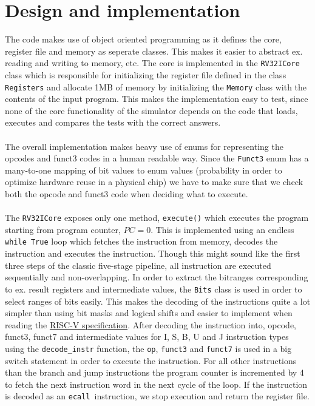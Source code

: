 \documentclass{article}
\begin{document}
\section{Design and implementation}
The code makes use of object oriented programming as it defines the core, register file and memory as seperate classes. This makes it easier to abstract ex. reading and writing to memory, etc. The core is implemented in the \Verb|RV32ICore| class which is responsible for initializing the register file defined in the class \Verb|Registers| and allocate 1MB of memory by initializing the \Verb|Memory| class with the contents of the input program. This makes the implementation easy to test, since none of the core functionality of the simulator depends on the code that loads, executes and compares the tests with the correct answers. \\
\\
The overall implementation makes heavy use of enums for representing the opcodes and funct3 codes in a human readable way. Since the \Verb|Funct3| enum has a many-to-one mapping of bit values to enum values (probability in order to optimize hardware reuse in a physical chip) we have to make sure that we check both the opcode and funct3 code when deciding what to execute. \\
\\
The \Verb|RV32ICore| exposes only one method, \Verb|execute()| which executes the program starting from program counter, $PC = 0$. This is implemented using an endless \Verb|while True| loop which fetches the instruction from memory, decodes the instruction and executes the instruction. Though this might sound like the first three steps of the classic five-stage pipeline, all instruction are executed sequentially and non-overlapping. In order to extract the bitranges corresponding to ex. result registers and intermediate values, the \Verb|Bits| class is used in order to select ranges of bits easily. This makes the decoding of the instructions quite a lot simpler than using bit masks and logical shifts and easier to implement when reading the 
\href{https://riscv.org/technical/specifications/}{RISC-V specification}. After decoding the instruction into, opcode, funct3, funct7 and intermediate values for I, S, B, U and J instruction types using the \Verb|decode_instr| function, the \Verb|op|, \Verb|funct3| and \Verb|funct7| is used in a big switch statement in order to execute the instruction. For all other instructions than the branch and jump instructions the program counter is incremented by 4 to fetch the next instruction word in the next cycle of the loop. If the instruction is decoded as an \Verb|ecall| instruction, we stop execution and return the register file. \\
\end{document}
